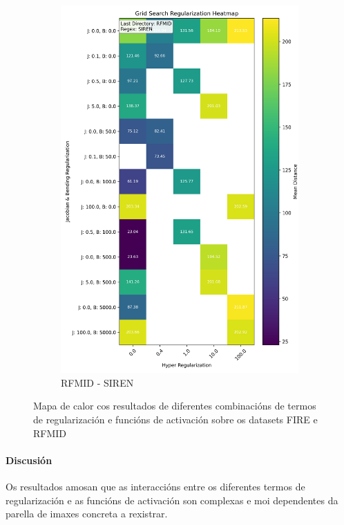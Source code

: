 \begin{figure}[tbp]
\begin{subfigure}[b]{0.4\textwidth}
        \includegraphics[width=\textwidth]{imaxes/grid_search_single_heatmap_RFMID_SIREN.png}
        \caption{RFMID - SIREN}
        \label{fig:gs_single_RFMID_SIREN}
    \end{subfigure}
    
    \caption{Mapa de calor cos resultados de diferentes combinacións de termos de regularización e funcións de activación sobre os datasets FIRE e RFMID}
    \label{fig:gs_single_heatmaps}
\end{figure}

\paragraph{Discusión}
\label{par:Discusion-reg2}

Os resultados amosan que as interaccións entre os diferentes termos de regularización e as funcións de activación son complexas e moi dependentes da parella de imaxes concreta a rexistrar.

\FloatBarrier